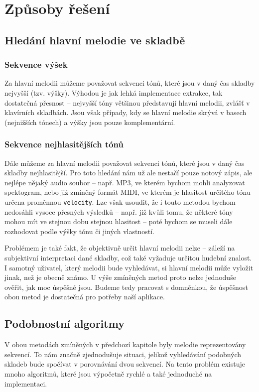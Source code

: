 \section{Způsoby řešení}

\subsection{Hledání hlavní melodie ve skladbě}

\subsubsection*{Sekvence výšek}
Za hlavní melodii můžeme považovat sekvenci tónů, které jsou v daný čas skladby nejvyšší (tzv. výšky). Výhodou je jak lehká implementace extrakce, tak dostatečná přesnost -- nejvyšší tóny většinou představují hlavní melodii, zvlášť v klavírních skladbách. Jsou však případy, kdy se hlavní melodie skrývá v basech (nejnižších tónech) a výšky jsou pouze komplementární. 

\subsubsection*{Sekvence nejhlasitějších tónů}
Dále můžeme za hlavní melodii považovat sekvenci tónů, které jsou v daný čas skladby nejhlasitější. Pro toto hledání nám už ale nestačí pouze notový zápis, ale nejlépe nějaký audio soubor -- např. MP3, ve kterém bychom mohli analyzovat spektogram, nebo již zmíněný formát MIDI, ve kterém je hlasitost určitého tónu určena proměnnou \lstinline{velocity}. Lze však usoudit, že i touto metodou bychom nedosáhli vysoce přesných výsledků -- např. již kvůli tomu, že některé tóny mohou mít ve stejnou dobu stejnou hlasitost -- poté bychom se museli dále rozhodovat podle výšky tónu či jiných vlastností.

Problémem je také fakt, že objektivně určit hlavní melodii nelze -- záleží na subjektivní interpretaci dané skladby, což také vyžaduje určitou hudební znalost. I samotný uživatel, který melodii bude vyhledávat, si hlavní melodii může vyložit jinak, než je obecně známo. U výše zmíněných metod proto nelze jednoduše ověřit, jak moc úspěšné jsou. Budeme tedy pracovat s domněnkou, že úspěšnost obou metod je dostatečná pro potřeby naší aplikace.

\subsection{Podobnostní algoritmy}
V obou metodách zmíněných v předchozí kapitole byly melodie reprezentovány sekvencí. To nám značně zjednodušuje situaci, jelikož vyhledávání podobných skladeb bude spočívat v porovnávání dvou sekvencí. Na tento problém existuje mnoho algoritmů, které jsou výpočetně rychlé a také jednoduché na implementaci.

